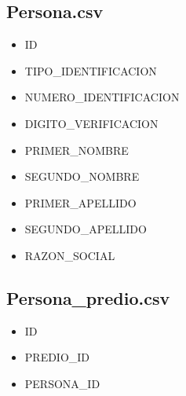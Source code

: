 \documentclass[letterpaper,10pt,spanish]{sphinxmanual}
\begin{document}
\subsection{Persona.csv}
\label{\detokenize{ETL_SNC/Structure:persona-csv}}\begin{itemize}
\item {} 
ID

\item {} 
TIPO\_IDENTIFICACION

\item {} 
NUMERO\_IDENTIFICACION

\item {} 
DIGITO\_VERIFICACION

\item {} 
PRIMER\_NOMBRE

\item {} 
SEGUNDO\_NOMBRE

\item {} 
PRIMER\_APELLIDO

\item {} 
SEGUNDO\_APELLIDO

\item {} 
RAZON\_SOCIAL

\end{itemize}


\subsection{Persona\_predio.csv}
\label{\detokenize{ETL_SNC/Structure:persona-predio-csv}}\begin{itemize}
\item {} 
ID

\item {} 
PREDIO\_ID

\item {} 
PERSONA\_ID

\end{itemize}
\end{document}
